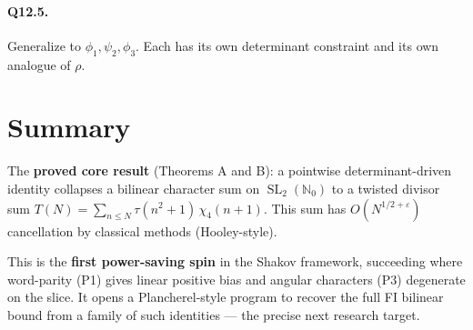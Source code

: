 \documentclass[11pt]{article}
\DeclareMathOperator{\SL}{SL}
\begin{document}
\paragraph{Q12.5.} Generalize to $\phi_1, \psi_2, \phi_3$. Each has its own
determinant constraint and its own analogue of $\rho$.

\section{Summary}

The \textbf{proved core result} (Theorems A and B): a pointwise determinant-driven
identity collapses a bilinear character sum on $\SL_2(\mathbb{N}_0)$ to a
twisted divisor sum $T(N) = \sum_{n \le N} \tau(n^2+1)\,\chi_4(n+1)$. This
sum has $O(N^{1/2+\varepsilon})$ cancellation by classical methods
(Hooley-style).

This is the \textbf{first power-saving spin} in the Shakov framework, succeeding
where word-parity (P1) gives linear positive bias and angular characters (P3)
degenerate on the slice. It opens a Plancherel-style program to recover the
full FI bilinear bound from a family of such identities --- the precise next
research target.
\end{document}
